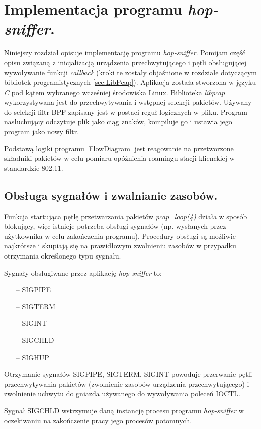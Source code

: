 \section{Implementacja programu \emph{hop-sniffer}.}

Niniejszy rozdział opisuje implementację programu \emph{hop-sniffer}. Pomijam część opisu związaną z inicjalizacją urządzenia przechwytującego i pętli obsługującej wywoływanie funkcji \emph{callback} (kroki te zostały objaśnione w rozdziale dotyczącym bibliotek programistycznych \ref{sec:LibPcap}). Aplikacja została stworzona w języku \emph{C} pod kątem wybranego wcześniej środowiska Linux. Biblioteka \emph{libpcap} wykorzystywana jest do przechwytywania i wstępnej selekcji pakietów. Używany do selekcji filtr BPF zapisany jest w postaci reguł logicznych w pliku. Program nasłuchujący odczytuje plik jako ciąg znaków, kompiluje go i ustawia jego program jako nowy filtr.   

Podstawą logiki programu \ref{FlowDiagram} jest reagowanie na przetworzone składniki pakietów w celu pomiaru opóźnienia roamingu stacji klienckiej w standardzie 802.11.   

\subsection{Obsługa sygnałów i zwalnianie zasobów.}

Funkcja startująca pętlę przetwarzania pakietów \emph{pcap\_loop(4)} działa w sposób blokujący, więc istnieje potrzeba obsługi sygnałów (np. wysłanych przez użytkownika w celu zakończenia programu). Procedury obsługi są możliwie najkrótsze i skupiają się na prawidłowym zwolnieniu zasobów w przypadku otrzymania określonego typu sygnału. 

Sygnały obsługiwane przez aplikację \emph{hop-sniffer} to:
\begin{itemize}
\item[--] SIGPIPE
\item[--] SIGTERM
\item[--] SIGINT
\item[--] SIGCHLD
\item[--] SIGHUP
\end{itemize}

Otrzymanie sygnałów SIGPIPE, SIGTERM, SIGINT powoduje przerwanie pętli przechwytywania pakietów (zwolnienie zasobów urządzenia przechwytującego) i zwolnienie uchwytu do gniazda używanego do wywoływania poleceń IOCTL. 

Sygnał SIGCHLD wstrzymuje daną instancję procesu programu \emph{hop-sniffer} w oczekiwaniu na zakończenie pracy jego procesów potomnych. 

